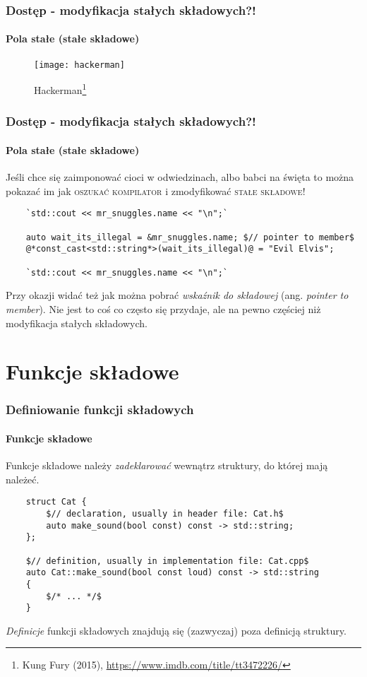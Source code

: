 \documentclass[aspectratio=169,10pt]{beamer}
\begin{document}
\begin{frame}
    \frametitle{Dostęp - modyfikacja stałych składowych?!}
    \framesubtitle{Pola stałe (stałe składowe)}

    \begin{figure}[!htp]
        \centering
        \texttt{[image: hackerman]}
        \caption{Hackerman\footnote{Kung Fury (2015), \url{https://www.imdb.com/title/tt3472226/}}}
    \end{figure}
\end{frame}

\begin{frame}[fragile]
    \frametitle{Dostęp - modyfikacja stałych składowych?!}
    \framesubtitle{Pola stałe (stałe składowe)}
    \label{hackerman_const_field_mutation}

    Jeśli chce się zaimponować cioci w odwiedzinach, albo babci na święta to
    można pokazać im jak \textsc{oszukać kompilator} i zmodyfikować
    \textsc{stałe składowe}!

    {\scriptsize
    \begin{lstlisting}
    `std::cout << mr_snuggles.name << "\n";`

    auto wait_its_illegal = &mr_snuggles.name; $// pointer to member$
    @*const_cast<std::string*>(wait_its_illegal)@ = "Evil Elvis";

    `std::cout << mr_snuggles.name << "\n";`
    \end{lstlisting}}

    {\tiny Przy okazji widać też jak można pobrać \emph{wskaźnik do składowej}
    (ang. \emph{pointer to member}). Nie jest to coś co często się przydaje, ale
    na pewno częściej niż modyfikacja stałych składowych.}
\end{frame}

\section{Funkcje składowe}

\begin{frame}[fragile]
    \frametitle{Definiowanie funkcji składowych}
    \framesubtitle{Funkcje składowe}

    Funkcje składowe należy \emph{zadeklarować} wewnątrz struktury, do której mają
    należeć.

    {\small
    \begin{lstlisting}
    struct Cat {
        $// declaration, usually in header file: Cat.h$
        auto make_sound(bool const) const -> std::string;
    };

    $// definition, usually in implementation file: Cat.cpp$
    auto Cat::make_sound(bool const loud) const -> std::string
    {
        $/* ... */$
    }
    \end{lstlisting}}

    \emph{Definicje} funkcji składowych znajdują się (zazwyczaj) poza definicją
    struktury.
\end{frame}
\end{document}
